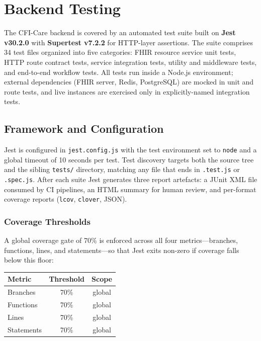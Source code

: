 \section{Backend Testing}

The CFI-Care backend is covered by an automated test suite built on
\textbf{Jest v30.2.0} with \textbf{Supertest v7.2.2} for HTTP-layer assertions.
The suite comprises 34 test files organized into five categories: FHIR resource
service unit tests, HTTP route contract tests, service integration tests, utility
and middleware tests, and end-to-end workflow tests. All tests run inside a
Node.js environment; external dependencies (FHIR server, Redis, PostgreSQL) are
mocked in unit and route tests, and live instances are exercised only in
explicitly-named integration tests.

\subsection{Framework and Configuration}

Jest is configured in \texttt{jest.config.js} with the test environment set to
\texttt{node} and a global timeout of 10 seconds per test. Test discovery
targets both the source tree and the sibling \texttt{tests/} directory, matching
any file that ends in \texttt{.test.js} or \texttt{.spec.js}. After each suite
Jest generates three report artefacts: a JUnit XML file consumed by CI pipelines,
an HTML summary for human review, and per-format coverage reports (\texttt{lcov},
\texttt{clover}, JSON).

\subsubsection{Coverage Thresholds}
A global coverage gate of 70\% is enforced across all four metrics---branches,
functions, lines, and statements---so that Jest exits non-zero if coverage falls
below this floor:

\begin{center}\small
\begin{tabular}{lcc}
\hline
\textbf{Metric} & \textbf{Threshold} & \textbf{Scope} \\
\hline
Branches    & 70\% & global \\
Functions   & 70\% & global \\
Lines       & 70\% & global \\
Statements  & 70\% & global \\
\hline
\end{tabular}
\end{center}

